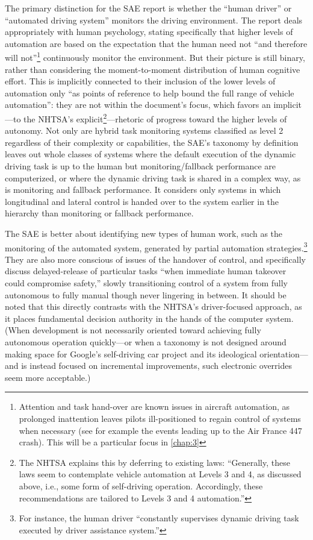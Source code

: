 The primary distinction for the SAE report is whether the ``human driver'' or ``automated
driving system'' monitors the driving environment.\cite[p. 5]{SAE} The report deals
appropriately with human psychology, stating specifically that higher
levels of automation are based on the expectation that the human need
not ``and therefore will not''\footnote{Attention and task hand-over are
  known issues in aircraft automation, as prolonged inattention leaves
  pilots ill-positioned to regain control of systems when necessary
  (see for example the events leading up to the Air France 447
  crash). This will be a particular focus in \ref{chap:3}} continuously
monitor the environment.\cite[p. 9]{SAE} But their 
picture is still binary, rather than considering the moment-to-moment
distribution of human 
cognitive effort. This is implicitly connected to their inclusion of
the lower levels of automation only ``as points of reference to help
bound the full range of vehicle automation''\cite[p. 2]{SAE}: they are not within
the document's focus, which favors an implicit---to the NHTSA's
explicit\footnote{The NHTSA explains this by deferring to existing
  laws: ``Generally, these laws seem to contemplate vehicle 
automation at Levels 3 and 4, as discussed above, i.e., some form of
self-driving operation. 
Accordingly, these recommendations are tailored to Levels 3 and 4
automation.''\cite[p. 10]{NHTSA}}---rhetoric of progress toward the
higher levels of autonomy. 
Not only are hybrid task monitoring systems classified as level 2
regardless of their complexity or capabilities, the SAE's taxonomy by
definition leaves out whole classes of systems where the default
execution of the dynamic driving task is up to the human but
monitoring/fallback performance are computerized, or where the dynamic
driving task is shared in a complex way, as is monitoring and fallback
performance. It considers only systems in which longitudinal and
lateral control is handed over to the system earlier in the hierarchy
than monitoring or fallback performance.

The SAE is better about
identifying new types of human work, such as the monitoring of the
automated system, generated by partial automation
strategies.\footnote{For instance, the human driver ``constantly
  supervises dynamic driving task executed by driver assistance
  system.''\cite[p. 3]{SAE}} They
are also more conscious of issues of the handover of control, and
specifically discuss delayed-release of particular tasks ``when
immediate human takeover could compromise safety,'' slowly
transitioning control of a system from fully autonomous to fully
manual though never lingering in between.\cite[p. 4]{SAE} It should be
noted that this directly contrasts with the NHTSA's driver-focused
approach, as it places fundamental decision authority in the hands of
the computer system. (When development is not necessarily oriented
toward achieving fully autonomous operation quickly---or when a
taxonomy is not designed around making space for Google's self-driving
car project and its ideological orientation---and is instead
focused on incremental improvements, such electronic overrides seem more acceptable.)

